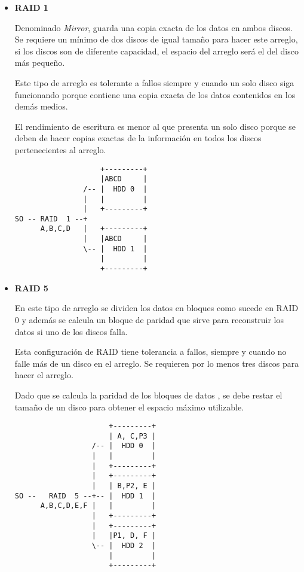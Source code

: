 \begin{itemize}
  \item \textbf{RAID 1}

Denominado \emph{Mirror}, guarda una copia exacta de los datos en ambos discos. Se requiere un m\'{i}nimo de dos discos de igual tama\~{n}o para hacer este arreglo, si los discos son de diferente capacidad, el espacio del arreglo ser\'{a} el del disco m\'{a}s peque\~{n}o.

Este tipo de arreglo es tolerante a fallos siempre y cuando un solo disco siga funcionando porque contiene una copia exacta de los datos contenidos en los dem\'{a}s medios.

El rendimiento de escritura es menor al que presenta un solo disco porque se deben de hacer copias exactas de la informaci\'{o}n en todos los discos pertenecientes al arreglo.

{
\scriptsize
\linespread{1}
\begin{verbatim}
                    +---------+
                    |ABCD     |
                /-- |  HDD 0  |
                |   |         |
                |   +---------+
SO -- RAID  1 --+
      A,B,C,D   |   +---------+
                |   |ABCD     |
                \-- |  HDD 1  |
                    |         |
                    +---------+
\end{verbatim}
}

  \item \textbf{RAID 5}

En este tipo de arreglo se dividen los datos en bloques como sucede en \textsc{RAID} 0 y adem\'{a}s se calcula un bloque de paridad que sirve para reconstruir los datos si uno de los discos falla.

Esta configuraci\'{o}n de \textsc{RAID} tiene tolerancia a fallos, siempre y cuando no falle m\'{a}s de un disco en el arreglo. Se requieren por lo menos tres discos para hacer el arreglo.

Dado que se calcula la paridad de los bloques de datos , se debe restar el tama\~{n}o de un disco para obtener el espacio m\'{a}ximo utilizable.

{
\scriptsize
\linespread{1}
\begin{verbatim}
                      +---------+
                      | A, C,P3 |
                  /-- |  HDD 0  |
                  |   |         |
                  |   +---------+
                  |   +---------+
                  |   | B,P2, E |
SO --   RAID  5 --+-- |  HDD 1  |
      A,B,C,D,E,F |   |         |
                  |   +---------+
                  |   +---------+
                  |   |P1, D, F |
                  \-- |  HDD 2  |
                      |         |
                      +---------+
\end{verbatim}
}


\end{itemize}
